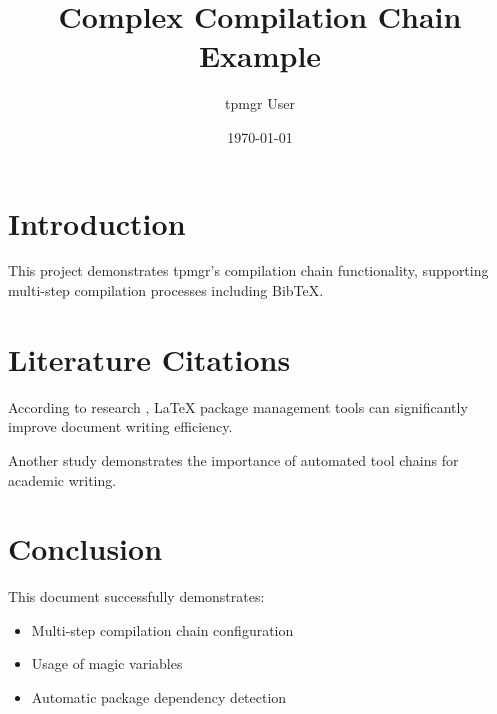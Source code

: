 \documentclass{article}
\title{Complex Compilation Chain Example}
\author{tpmgr User}
\date{\today}
\begin{document}
\maketitle

\section{Introduction}
This project demonstrates tpmgr's compilation chain functionality, supporting multi-step compilation processes including BibTeX.

\section{Literature Citations}
According to research \citep{example2023}, LaTeX package management tools can significantly improve document writing efficiency.

Another study \cite{smith2022} demonstrates the importance of automated tool chains for academic writing.

\section{Conclusion}
This document successfully demonstrates:
\begin{itemize}
    \item Multi-step compilation chain configuration
    \item Usage of magic variables
    \item Automatic package dependency detection
\end{itemize}



\end{document}
